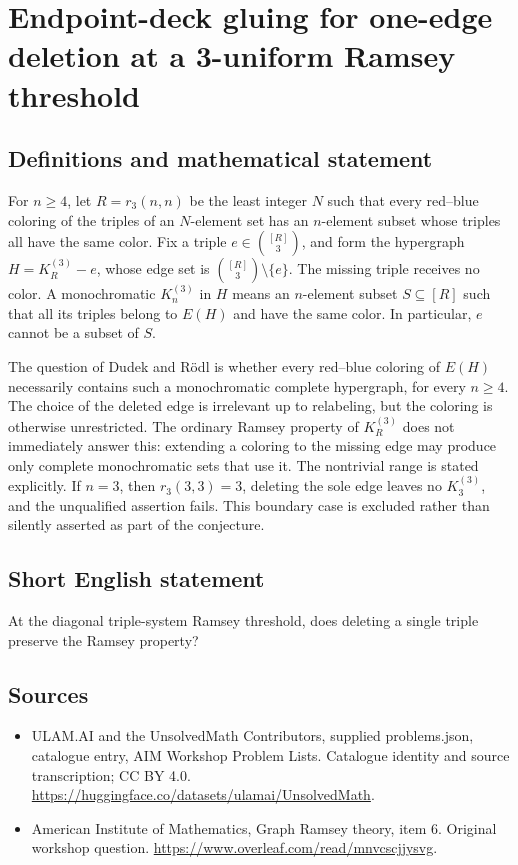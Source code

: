 \documentclass[11pt,a4paper]{article}
\begin{document}
\section*{Endpoint-deck gluing for one-edge deletion at a 3-uniform Ramsey threshold}\label{statement}

\subsection{Definitions and mathematical statement}
For $n\ge4$, let $R=r_3(n,n)$ be the least integer $N$ such that every
red--blue coloring of the triples of an $N$-element set has an
$n$-element subset whose triples all have the same color.
Fix a triple $e\in\binom{[R]}3$, and form the hypergraph
$H=K_R^{(3)}-e$, whose edge set is
$\binom{[R]}3\setminus\{e\}$. The missing triple receives no color.
A monochromatic $K_n^{(3)}$ in $H$ means an $n$-element subset
$S\subseteq[R]$ such that all its triples belong to $E(H)$ and have
the same color. In particular, $e$ cannot be a subset of $S$.

The question of Dudek and R\"odl is whether every red--blue coloring
of $E(H)$ necessarily contains such a monochromatic complete
hypergraph, for every $n\ge4$. The choice of the deleted edge is
irrelevant up to relabeling, but the coloring is otherwise unrestricted.
The ordinary Ramsey property of $K_R^{(3)}$ does not immediately
answer this: extending a coloring to the missing edge may produce
only complete monochromatic sets that use it.
The nontrivial range is stated explicitly. If $n=3$, then
$r_3(3,3)=3$, deleting the sole edge leaves no $K_3^{(3)}$, and the
unqualified assertion fails. This boundary case is excluded rather
than silently asserted as part of the conjecture.
\subsection{Short English statement}
At the diagonal triple-system Ramsey threshold, does deleting a single triple preserve the Ramsey property?
\subsection{Sources}
\begin{itemize}
\item[S1] ULAM.AI and the UnsolvedMath Contributors, supplied problems.json, catalogue entry, AIM Workshop Problem Lists. Catalogue identity and source transcription; CC BY 4.0.
\url{https://huggingface.co/datasets/ulamai/UnsolvedMath}.
\item[S2] American Institute of Mathematics, Graph Ramsey theory, item 6. Original workshop question.
\url{https://www.overleaf.com/read/mnvcscjjysvg}.
\end{itemize}
\end{document}
